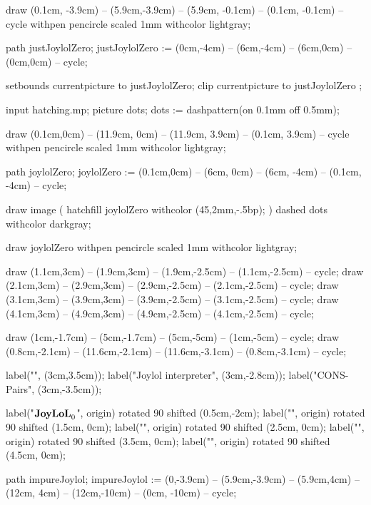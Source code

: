 draw (0.1cm, -3.9cm) -- (5.9cm,-3.9cm) -- (5.9cm, -0.1cm) -- (0.1cm, -0.1cm) -- cycle
  withpen pencircle scaled 1mm
  withcolor lightgray;

path justJoylolZero;
justJoylolZero := (0cm,-4cm) -- (6cm,-4cm) -- (6cm,0cm) -- (0cm,0cm) -- cycle;

setbounds currentpicture to justJoylolZero;
clip currentpicture to justJoylolZero ;
\stopMPcode\egroup

\bgroup\startMPcode
input hatching.mp;
picture dots; dots := dashpattern(on 0.1mm off 0.5mm);


draw (0.1cm,0cm) -- (11.9cm, 0cm) -- (11.9cm, 3.9cm) -- (0.1cm, 3.9cm) -- cycle
  withpen pencircle scaled 1mm
  withcolor lightgray;

path joylolZero;
joylolZero := (0.1cm,0cm) -- (6cm, 0cm) --
  (6cm, -4cm) -- (0.1cm, -4cm) -- cycle;

draw image (
  hatchfill joylolZero
    withcolor (45,2mm,-.5bp);
) dashed dots withcolor darkgray;

draw joylolZero
  withpen pencircle scaled 1mm
  withcolor lightgray;


draw (1.1cm,3cm) -- (1.9cm,3cm) -- (1.9cm,-2.5cm) -- (1.1cm,-2.5cm) -- cycle;
draw (2.1cm,3cm) -- (2.9cm,3cm) -- (2.9cm,-2.5cm) -- (2.1cm,-2.5cm) -- cycle;
draw (3.1cm,3cm) -- (3.9cm,3cm) -- (3.9cm,-2.5cm) -- (3.1cm,-2.5cm) -- cycle;
draw (4.1cm,3cm) -- (4.9cm,3cm) -- (4.9cm,-2.5cm) -- (4.1cm,-2.5cm) -- cycle;

draw (1cm,-1.7cm) -- (5cm,-1.7cm) -- (5cm,-5cm) -- (1cm,-5cm) -- cycle;
draw (0.8cm,-2.1cm) -- (11.6cm,-2.1cm) -- (11.6cm,-3.1cm) -- (0.8cm,-3.1cm) -- cycle;


label("", (3cm,3.5cm));
label("Joylol interpreter", (3cm,-2.8cm));
label("CONS-Pairs", (3cm,-3.5cm));

label("$\bold{JoyLoL}_0$", origin) rotated 90 shifted (0.5cm,-2cm);
label("", origin) rotated 90 shifted (1.5cm, 0cm);
label("", origin) rotated 90 shifted (2.5cm, 0cm);
label("", origin) rotated 90 shifted (3.5cm, 0cm);
label("", origin) rotated 90 shifted (4.5cm, 0cm);

path impureJoylol;
impureJoylol := (0,-3.9cm) -- (5.9cm,-3.9cm) -- (5.9cm,4cm) -- (12cm, 4cm) --
  (12cm,-10cm) -- (0cm, -10cm) -- cycle;

